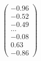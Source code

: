 \documentclass[preview]{standalone}
\begin{document}
\begin{align*}
\begin{pmatrix} -0.96 \\ -0.52 \\ -0.49 \\ \dots \\ -0.08 \\ 0.63 \\ -0.86 \end{pmatrix}
\end{align*}
\end{document}
